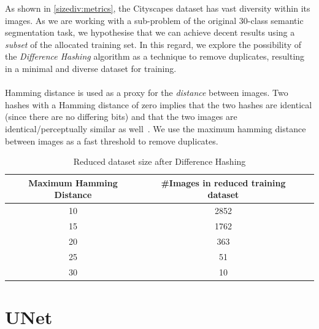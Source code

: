 \documentclass[letterpaper, 10 pt, conference]{ieeeconf}  %
\begin{document}
As shown in \ref{sizediv:metrics}, the Cityscapes dataset has vast diversity within its images. As we are working with a sub-problem of the original 30-class semantic segmentation task, we hypothesise that we can achieve decent results using a \textit{subset} of the allocated training set. In this regard, we explore the possibility of the \textit{Difference Hashing} algorithm as a technique to remove duplicates, resulting in a minimal and diverse dataset for training. \\ \\
Hamming distance is used as a proxy for the \textit{distance} between images. Two hashes with a Hamming distance of zero implies that the two hashes are identical (since there are no differing bits) and that the two images are identical/perceptually similar as well~\cite{Rosebrock_2021}. We use the maximum hamming distance between images as a fast threshold to remove duplicates.

\begin{table}[!h]
\vspace{-2mm}
\caption{Reduced dataset size after Difference Hashing}
\vspace{-4mm}
\label{dhash:metrics}
\begin{center}
\begin{tabular}{|c|c|c|}
\hline
\textbf{Maximum Hamming Distance} & \textbf{\#Images in reduced training dataset}  \\
\hline
10 & 2852  \\
\hline
15 & 1762 \\
\hline
20 & 363 \\
\hline
25 & 51 \\
\hline 
30 & 10 \\
\hline
\end{tabular}
\end{center}
\vspace{-6mm}
\end{table}


\section{UNet}
\label{unet}
\end{document}
